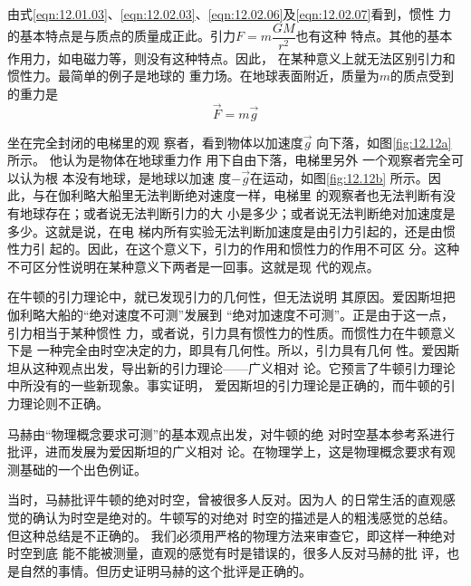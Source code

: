 由式\eqref{eqn:12.01.03}、\eqref{eqn:12.02.03}、\eqref{eqn:12.02.06}及\eqref{eqn:12.02.07}看到，惯性
力的基本特点是与质点的质量成正此。引力$ F = m \dfrac { G M } { r ^ { 2 } } $也有这种
特点。其他的基本作用力，如电磁力等，则没有这种特点。因此，
在某种意义上就无法区别引力和惯性力。最简单的例子是地球的
重力场。在地球表面附近，质量为$ m $的质点受到的重力是
\begin{equation*}
  \vec{F} = m \vec{g}
\end{equation*}
\begin{figure}
  \vspace{-2em}
  \centering
  \caption{}
  \label{fig:12.12}
\end{figure}
坐在完全封闭的电梯里的观
察者，看到物体以加速度$ \vec{g} $
向下落，如图\ref{fig:12.12a}所示。
他认为是物体在地球重力作
用下自由下落，电梯里另外
一个观察者完全可以认为根
本没有地球，是地球以加速
度$-\vec{g}$在运动，如图\ref{fig:12.12b}
所示。因此，与在伽利略大船里无法判断绝对速度一样，电梯里
的观察者也无法判断有没有地球存在；或者说无法判断引力的大
小是多少；或者说无法判断绝对加速度是多少。这就是说，在电
梯内所有实验无法判断加速度是由引力引起的，还是由惯性力引
起的。因此，在这个意义下，引力的作用和惯性力的作用不可区
分。这种不可区分性说明在某种意义下两者是一回事。这就是现
代的观点。

在牛顿的引力理论中，就已发现引力的几何性，但无法说明
其原因。爱因斯坦把伽利略大船的“绝对速度不可测”发展到
“绝对加速度不可测”。正是由于这一点，引力相当于某种惯性
力，或者说，引力具有惯性力的性质。而惯性力在牛顿意义下是
一种完全由时空决定的力，即具有几何性。所以，引力具有几何
性。爱因斯坦从这种观点出发，导出新的引力理论——广义相对
论。它预言了牛顿引力理论中所没有的一些新现象。事实证明，
爱因斯坦的引力理论是正确的，而牛顿的引力理论则不正确。

{马\ziju{-0.005pt}赫由“物理概念要求可测”的基本观点出发，对牛顿的绝
对时空基本参考系进行批评，进而发展为爱因斯坦的广义相对
论。在物理学上，这是物理概念要求有观测基础的一个出色例证。}

当时，马赫批评牛顿的绝对时空，曾被很多人反对。因为人
的日常生活的直观感觉的确认为时空是绝对的。牛顿写的对绝对
时空的描述是人的粗浅感觉的总结。但这种总结是不正确的。
我们必须用严格的物理方法来审查它，即这样一种绝对时空到底
能不能被测量，直观的感觉有时是错误的，很多人反对马赫的批
评，也是自然的事情。但历史证明马赫的这个批评是正确的。
